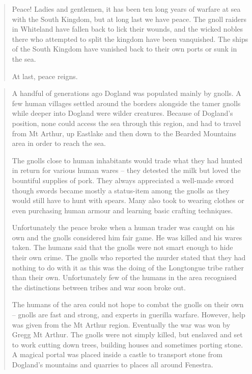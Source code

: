 \begin{quotation}

Peace!  Ladies and gentlemen, it has been ten long years of warfare at sea with the South Kingdom, but at long last we have peace.  The gnoll raiders in Whiteland have fallen back to lick their wounds, and the wicked nobles there who attempted to split the kingdom have been vanquished.  The ships of the South Kingdom have vanished back to their own ports or sunk in the sea.

	At last, peace reigns.

\end{quotation}

\begin{quotation}

A handful of generations ago Dogland was populated mainly by gnolls.  A few human villages settled around the borders alongside the tamer gnolls while deeper into Dogland were wilder creatures.  Because of Dogland's position, none could access the sea through this region, and had to travel from Mt Arthur, up Eastlake and then down to the Bearded Mountains area in order to reach the sea.

	The gnolls close to human inhabitants would trade what they had hunted in return for various human wares -- they detested the milk but loved the bountiful supplies of pork.  They always appreciated a well-made sword though swords became mostly a status-item among the gnolls as they would still have to hunt with spears.  Many also took to wearing clothes or even purchasing human armour and learning basic crafting techniques.

	Unfortunately the peace broke when a human trader was caught on his own and the gnolls considered him fair game.  He was killed and his wares taken.  The humans said that the gnolls were not smart enough to hide their own crime.  The gnolls who reported the murder stated that they had nothing to do with it as this was the doing of the Longtongue tribe rather than their own.  Unfortunately few of the humans in the area recognised the distinctions between tribes and war soon broke out.

	The humans of the area could not hope to combat the gnolls on their own -- gnolls are fast and strong, and experts in guerilla warfare.  However, help was given from the Mt Arthur region.  Eventually the war was won by Gregg Mt Arthur.  The gnolls were not simply killed, but enslaved and set to work cutting down trees, building houses and sometimes porting stone.  A magical portal was placed inside a castle to transport stone from Dogland's mountains and quarries to places all around Fenestra.


\end{quotation}
